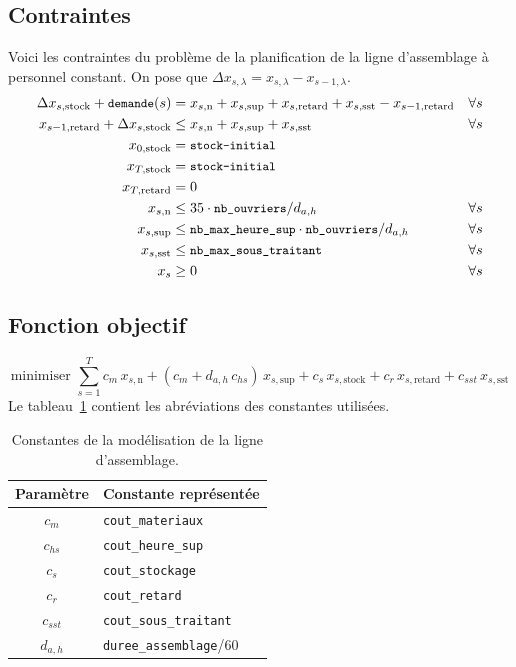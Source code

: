 \documentclass[12pt,oneside,a4paper]{article}
\newcommand{\myX}[2]{x_{#1,\text{#2}}}
\newcommand{\xSemaine}[1]{\myX{s}{#1}}
\newcommand{\xn}{\xSemaine{n}}
\newcommand{\xsup}{\xSemaine{sup}}
\newcommand{\xstock}{\xSemaine{stock}}
\newcommand{\xretard}{\xSemaine{retard}}
\newcommand{\xsst}{\xSemaine{sst}}
\newcommand{\texttts}[1]{{\small\texttt{#1}}}
\begin{document}
\subsection*{Contraintes}
Voici les contraintes du problème de la planification 
de la ligne d’assemblage à personnel constant.
On pose que $\Delta x_{s,\lambda} = x_{s,\lambda} - x_{s-1,\lambda}$.
\begin{align*}
  \Delta\xstock + \texttts{demande}(s) &= \xn + \xsup 
  + \xretard + \xsst - \myX{s-1}{retard} &\forall s \\
  \myX{s-1}{retard} + \Delta\xstock &\leq \xn + \xsup + \xsst &\forall s \\
  \myX{0}{stock} &= \texttts{stock-initial} \\
  \myX{T}{stock} &= \texttts{stock-initial} \\
  \myX{T}{retard}&= 0 \\
  \xn &\leq 35\cdot \texttts{nb\_ouvriers}/ d_{a,h}
  &\forall s \\
  \xsup &\leq \texttts{nb\_max\_heure\_sup}\cdot\texttts{nb\_ouvriers}/ d_{a,h}
  &\forall s \\
  \xsst &\leq \texttts{nb\_max\_sous\_traitant} &\forall s \\
  x_s &\geq 0 &\forall s
\end{align*}

\subsection*{Fonction objectif}
\[
  \mbox{minimiser } 
  \sum_{s=1}^{T} 
  c_m\, \xn + (c_m + d_{a,h} \, c_{hs})\, \xsup
  + c_s\, \xstock + c_r\, \xretard + c_{sst}\, \xsst
\]
Le tableau~\ref{tab:constantesQuestion1} contient les abréviations
des constantes utilisées.
\begin{table}[h]
  \begin{center}
  \begin{tabular}{|c|l|}
    \hline
    Paramètre & Constante représentée \\
    \hline
    \hline
    $c_m$ & \texttt{cout\_materiaux} \\
    \hline
    $c_{hs}$ & \texttt{cout\_heure\_sup} \\
    \hline
    $c_s$ & \texttt{cout\_stockage} \\
    \hline
    $c_r$ & \texttt{cout\_retard} \\
    \hline
    $c_{sst}$ & \texttt{cout\_sous\_traitant} \\
    \hline
    $d_{a,h}$ & \texttt{duree\_assemblage}/60 \\
    \hline
  \end{tabular}
  \caption{Constantes de la modélisation de la ligne d'assemblage.}
  \label{tab:constantesQuestion1}
  \end{center}
\end{table}
\end{document}

